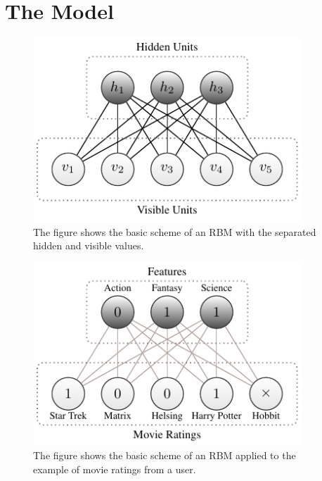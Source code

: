 \documentclass[crop=false,10pt]{standalone}
\begin{document}
  \section{The Model} %
  \label{sec:The Model}
    \begin{figure}
      \center
      \includegraphics[width=0.9\textwidth]{figures/rbm-scheme-inputs.pdf}
      \caption{%
        The figure shows the basic scheme of an RBM with the separated hidden and visible values.
      }
      \label{fig:rbm-scheme-inputs}
    \end{figure}
    \begin{figure}
      \center
      \includegraphics[width=0.9\textwidth]{figures/rbm-scheme-example.pdf}
      \caption{%
        The figure shows the basic scheme of an RBM applied to the example of movie ratings from a user.
      }
      \label{fig:rbm-scheme-example}
    \end{figure}
\end{document}
